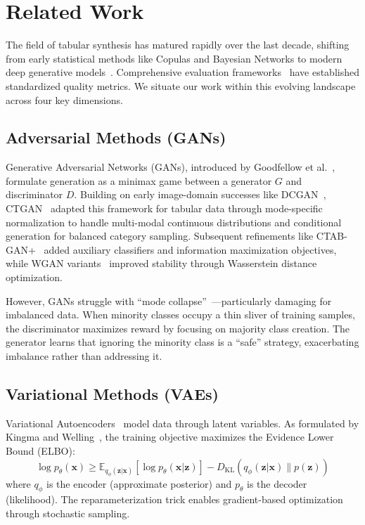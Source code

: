 \documentclass[conference]{IEEEtran}
\begin{document}
\section{Related Work}

The field of tabular synthesis has matured rapidly over the last decade, shifting from early statistical methods like Copulas and Bayesian Networks to modern deep generative models~\cite{figueira2022survey}. Comprehensive evaluation frameworks~\cite{elemam2020synthetic} have established standardized quality metrics. We situate our work within this evolving landscape across four key dimensions.

\subsection{Adversarial Methods (GANs)}
Generative Adversarial Networks (GANs), introduced by Goodfellow et al.~\cite{goodfellow2014gan}, formulate generation as a minimax game between a generator $G$ and discriminator $D$. Building on early image-domain successes like DCGAN~\cite{radford2016dcgan}, CTGAN~\cite{xu2019ctgan} adapted this framework for tabular data through mode-specific normalization to handle multi-modal continuous distributions and conditional generation for balanced category sampling. Subsequent refinements like CTAB-GAN+~\cite{zhao2022ctabgan} added auxiliary classifiers and information maximization objectives, while WGAN variants~\cite{arjovsky2017wgan} improved stability through Wasserstein distance optimization.

However, GANs struggle with ``mode collapse''~\cite{salimans2016improved}---particularly damaging for imbalanced data. When minority classes occupy a thin sliver of training samples, the discriminator maximizes reward by focusing on majority class creation. The generator learns that ignoring the minority class is a ``safe'' strategy, exacerbating imbalance rather than addressing it.

\subsection{Variational Methods (VAEs)}
Variational Autoencoders~\cite{kingma2014vae} model data through latent variables. As formulated by Kingma and Welling~\cite{kingma2014vae}, the training objective maximizes the Evidence Lower Bound (ELBO):
\begin{equation}
\log p_\theta(\mathbf{x}) \geq \mathbb{E}_{q_\phi(\mathbf{z}|\mathbf{x})}[\log p_\theta(\mathbf{x}|\mathbf{z})] - D_{\mathrm{KL}}(q_\phi(\mathbf{z}|\mathbf{x}) \| p(\mathbf{z}))
\end{equation}
where $q_\phi$ is the encoder (approximate posterior) and $p_\theta$ is the decoder (likelihood). The reparameterization trick enables gradient-based optimization through stochastic sampling.
\end{document}
